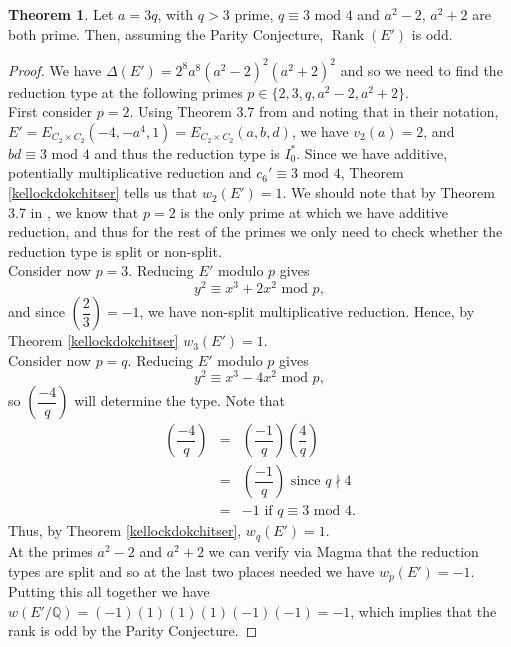 \documentclass{article}
\newcommand{\Q}{\mathbb{Q}}
\theoremstyle{definition}
\newtheorem{theorem}{Theorem}[section]
\DeclareMathOperator{\Rank}{Rank}
\begin{document}
\begin{theorem}
    Let $a = 3q$, with $q > 3$ prime, $q \equiv 3 \text{ mod } 4$ and $a^2 - 2$, $a^2 + 2$ are both prime. Then, assuming the Parity Conjecture, $\Rank(E')$ is odd.
\end{theorem}
\begin{proof}
    We have $\Delta(E') = 2^8 a^8 (a^2 - 2)^2 (a^2 + 2)^2$ and so we need to find the reduction type at the following primes $p \in \{2, 3, q, a^2 - 2, a^2 + 2 \}$. \\
    First consider $p = 2$. Using Theorem 3.7 from \cite{Barrios_2022} and noting that in their notation, $E' = E_{C_2 \times C_2}(-4, -a^4, 1) = E_{C_2 \times C_2}(a,b,d)$, we have $v_2(a) = 2$, and $bd \equiv 3 \text{ mod } 4$ and thus the reduction type is $I_0^*$. Since we have additive, potentially multiplicative reduction and $c_6' \equiv 3 \text{ mod } 4$, Theorem \ref{kellockdokchitser} tells us that $w_2(E') = 1$. We should note that by Theorem 3.7 in \cite{Barrios_2022}, we know that $p = 2$ is the only prime at which we have additive reduction, and thus for the rest of the primes we only need to check whether the reduction type is split or non-split. \\
    Consider now $p = 3$. Reducing $E'$ modulo $p$ gives
    $$ y^2 \equiv x^3 + 2x^2 \text{ mod } p, $$
    and since $\left( \dfrac{2}{3} \right) = -1$, we have non-split multiplicative reduction. Hence, by Theorem \ref{kellockdokchitser} $w_3(E') = 1$. \\
    Consider now $p = q$. Reducing $E'$ modulo $p$ gives
    $$ y^2 \equiv x^3 - 4x^2 \text{ mod } p,$$
    so $\left( \dfrac{-4}{q} \right)$ will determine the type. Note that
    \begin{eqnarray*}
        \left( \dfrac{-4}{q} \right) &=& \left( \dfrac{-1}{q} \right)\left( \dfrac{4}{q} \right) \\
        &=& \left( \dfrac{-1}{q} \right) \text{ since } q \nmid 4 \\
        &=& -1 \text{ if } q \equiv 3 \text{ mod } 4.
    \end{eqnarray*}
    Thus, by Theorem \ref{kellockdokchitser}, $w_q(E') = 1$. \\
    At the primes $a^2 - 2$ and $a^2 + 2$ we can verify via Magma that the reduction types are split and so at the last two places needed we have $w_p(E') = -1$. \\
    Putting this all together we have $w(E'/\Q) = (-1)(1)(1)(1)(-1)(-1) = -1$, which implies that the rank is odd by the Parity Conjecture.
\end{proof}
\end{document}
